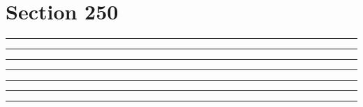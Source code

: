 \documentclass[11pt,a4paper]{article}
\begin{document}
\section{Section 250}
\begin{swarmwrap}%
  \begin{minipage}[t]{4cm}
    \centering
    \textcolor{red!20}{\rule{\linewidth}{9cm}}
  \end{minipage}%
\end{swarmwrap}%
\swarmwrapnext\lipsum[1]\lipsum[2]\lipsum[3]\lipsum[4]\lipsum[5]
\begin{swarmwrap}%
  \begin{minipage}[t]{5cm}
    \centering
    \textcolor{red!20}{\rule{\linewidth}{10cm}}
  \end{minipage}%
\end{swarmwrap}%
\swarmwrapnext\lipsum[1]\lipsum[2]\lipsum[3]\lipsum[4]\lipsum[5]\lipsum[6]
\begin{swarmwrap}%
  \begin{minipage}[t]{2cm}
    \centering
    \textcolor{red!20}{\rule{\linewidth}{2cm}}
  \end{minipage}%
\end{swarmwrap}%
\swarmwrapnext\lipsum[1]
\begin{swarmwrap}%
  \begin{minipage}[t]{3cm}
    \centering
    \textcolor{red!20}{\rule{\linewidth}{3cm}}
  \end{minipage}%
\end{swarmwrap}%
\swarmwrapnext\lipsum[1]\lipsum[2]
\begin{swarmwrap}%
  \begin{minipage}[t]{4cm}
    \centering
    \textcolor{red!20}{\rule{\linewidth}{4cm}}
  \end{minipage}%
\end{swarmwrap}%
\swarmwrapnext\lipsum[1]\lipsum[2]\lipsum[3]
\begin{swarmwrap}%
  \begin{minipage}[t]{5cm}
    \centering
    \textcolor{red!20}{\rule{\linewidth}{5cm}}
  \end{minipage}%
\end{swarmwrap}%
\swarmwrapnext\lipsum[1]\lipsum[2]\lipsum[3]\lipsum[4]
\begin{swarmwrap}%
  \begin{minipage}[t]{2cm}
    \centering
    \textcolor{red!20}{\rule{\linewidth}{6cm}}
  \end{minipage}%
\end{swarmwrap}%
\end{document}

